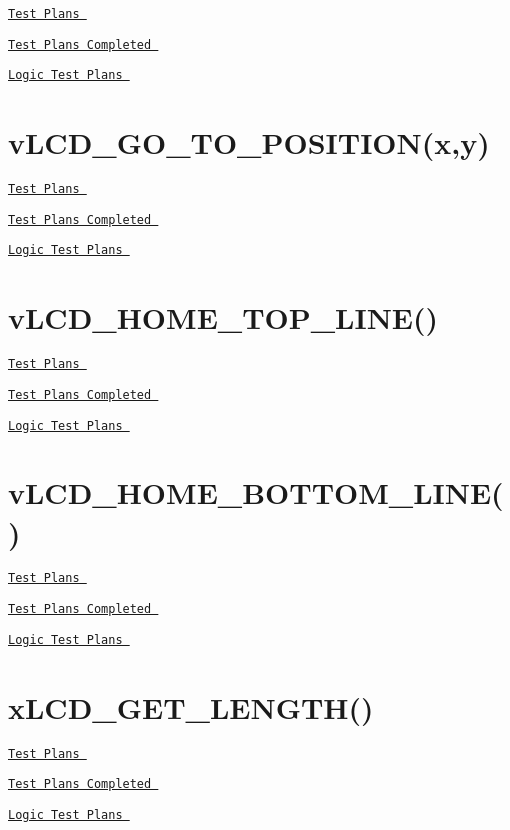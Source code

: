 \href{vLCD_CLEAR_BOTTOM_TESTPLAN.pdf}{\tt Test Plans } \par
 \href{vLCD_CLEAR_BOTTOM_TESTPLAN_COMPLETE.pdf}{\tt Test Plans Completed } \par
 \href{vLCD_CLEAR_BOTTOM_LOGIC.pdf}{\tt Logic Test Plans }\hypertarget{_test_plans_position}{}\section{v\-L\-C\-D\-\_\-\-G\-O\-\_\-\-T\-O\-\_\-\-P\-O\-S\-I\-T\-I\-O\-N(x,y)}\label{_test_plans_position}
\href{vLCD_GO_TO_POSITION_TESTPLAN.pdf}{\tt Test Plans } \par
 \href{vLCD_GO_TO_POSITION_TESTPLAN_COMPLETE.pdf}{\tt Test Plans Completed } \par
 \href{vLCD_GO_TO_POSITION_LOGIC.pdf}{\tt Logic Test Plans }\hypertarget{_test_plans_tophome}{}\section{v\-L\-C\-D\-\_\-\-H\-O\-M\-E\-\_\-\-T\-O\-P\-\_\-\-L\-I\-N\-E()}\label{_test_plans_tophome}
\href{vLCD_HOME_TOP_LINE_TESTPLAN.pdf}{\tt Test Plans } \par
 \href{vLCD_HOME_TOP_LINE_TESTPLAN_COMPLETE.pdf}{\tt Test Plans Completed } \par
 \href{vLCD_HOME_TOP_LINE_LOGIC.pdf}{\tt Logic Test Plans }\hypertarget{_test_plans_bottomhome}{}\section{v\-L\-C\-D\-\_\-\-H\-O\-M\-E\-\_\-\-B\-O\-T\-T\-O\-M\-\_\-\-L\-I\-N\-E()}\label{_test_plans_bottomhome}
\href{vLCD_HOME_BOTTOM_LINE_TESTPLAN.pdf}{\tt Test Plans } \par
 \href{vLCD_HOME_BOTTOM_LINE_TESTPLAN_COMPLETE.pdf}{\tt Test Plans Completed } \par
 \href{vLCD_HOME_BOTTOM_LINE_LOGIC.pdf}{\tt Logic Test Plans }\hypertarget{_test_plans_getlength}{}\section{x\-L\-C\-D\-\_\-\-G\-E\-T\-\_\-\-L\-E\-N\-G\-T\-H()}\label{_test_plans_getlength}
\href{vLCD_PRINT_STRING_TESTPLAN.pdf}{\tt Test Plans } \par
 \href{vLCD_PRINT_STRING_TESTPLAN_COMPLETE.pdf}{\tt Test Plans Completed } \par
 \href{vLCD_PRINT_STRING_LOGIC.pdf}{\tt Logic Test Plans } 